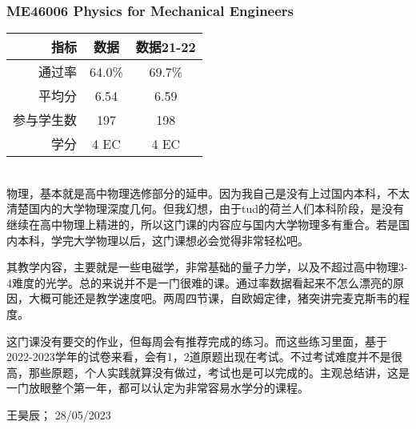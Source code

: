 \subsubsection{ME46006 Physics for Mechanical Engineers}
\begin{minipage}{0.45\textwidth}
\centering
{}
\end{minipage}%
\begin{minipage}{0.45\textwidth}
\raggedleft
\begin{tabular}{r|c|c}
\textbf{指标} & \textbf{数据} & \textbf{数据21-22}\\ \hline
通过率 & 64.0\% & 69.7\%\\ 
平均分 & 6.54 & 6.59\\ 
参与学生数 & 197 & 198\\ 
学分 & 4 EC & 4 EC\\
\end{tabular}
\end{minipage}\\

物理，基本就是高中物理选修部分的延申。因为我自己是没有上过国内本科，不太清楚国内的大学物理深度几何。但我幻想，由于tud的荷兰人们本科阶段，是没有继续在高中物理上精进的，所以这门课的内容应与国内大学物理多有重合。若是国内本科，学完大学物理以后，这门课想必会觉得非常轻松吧。

其教学内容，主要就是一些电磁学，非常基础的量子力学，以及不超过高中物理3-4难度的光学。总的来说并不是一门很难的课。通过率数据看起来不怎么漂亮的原因，大概可能还是教学速度吧。两周四节课，自欧姆定律，猪突讲完麦克斯韦的程度。

这门课没有要交的作业，但每周会有推荐完成的练习。而这些练习里面，基于2022-2023学年的试卷来看，会有1，2道原题出现在考试。不过考试难度并不是很高，那些原题，个人实践就算没有做过，考试也是可以完成的。主观总结讲，这是一门放眼整个第一年，都可以认定为非常容易水学分的课程。
\begin{flushright}
王昊辰； 28/05/2023
\end{flushright}


